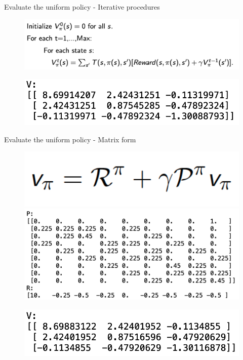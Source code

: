 \documentclass{beamer}
\begin{document}
\begin{frame}{Evaluate the uniform policy - Iterative procedures}
\begin{figure}[htpb]
    \centering
    \includegraphics[width=0.8\linewidth]{pic/iterative.png}
\end{figure}

\begin{figure}[htpb]
    \centering
    \includegraphics[width=0.7\linewidth]{pic/iterative_v.png}
\end{figure}
\end{frame}


\begin{frame}{Evaluate the uniform policy - Matrix form}
\begin{figure}[htpb]
    \centering
    \includegraphics[width=0.4\linewidth]{pic/matrix.png}
    \includegraphics[width=0.8\linewidth]{pic/PR.png}
\end{figure}

\begin{figure}[htpb]
    \centering
    \includegraphics[width=0.7\linewidth]{pic/matrix_v.png}
\end{figure}
\end{frame}
\end{document}
